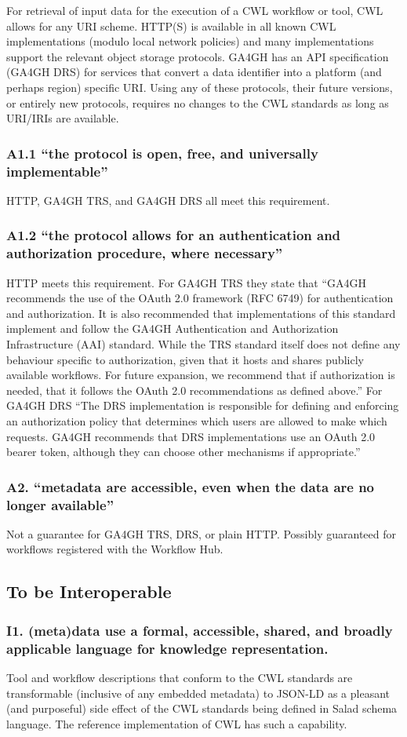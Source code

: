 For retrieval of input data for the execution of a CWL workflow or tool, CWL allows for any URI scheme. HTTP(S) is available in all known CWL implementations (modulo local network policies) and many implementations support the relevant object storage protocols. GA4GH has an API specification (GA4GH DRS) for services that convert a data identifier into a platform (and perhaps region) specific URI. Using any of these protocols, their future versions, or entirely new protocols, requires no changes to the CWL standards as long as URI/IRIs are available.
\subsubsection{A1.1 “the protocol is open, free, and universally implementable”}
HTTP, GA4GH TRS, and GA4GH DRS all meet this requirement.
\subsubsection{A1.2 “the protocol allows for an authentication and authorization procedure, where necessary”}
HTTP meets this requirement. For GA4GH TRS they state that “GA4GH recommends the use of the OAuth 2.0 framework (RFC 6749) for authentication and authorization. It is also recommended that implementations of this standard implement and follow the GA4GH Authentication and Authorization Infrastructure (AAI) standard.
While the TRS standard itself does not define any behaviour specific to authorization, given that it hosts and shares publicly available workflows. For future expansion, we recommend that if authorization is needed, that it follows the OAuth 2.0 recommendations as defined above.”
For GA4GH DRS “The DRS implementation is responsible for defining and enforcing an authorization policy that determines which users are allowed to make which requests. GA4GH recommends that DRS implementations use an OAuth 2.0 bearer token, although they can choose other mechanisms if appropriate.”
\subsubsection{A2. “metadata are accessible, even when the data are no longer available”}
Not a guarantee for GA4GH TRS, DRS, or plain HTTP. Possibly guaranteed for workflows registered with the Workflow Hub.
\subsection{To be Interoperable}
\subsubsection{I1. (meta)data use a formal, accessible, shared, and broadly applicable language for knowledge representation.}
Tool and workflow descriptions that conform to the CWL standards are transformable (inclusive of any embedded metadata) to JSON-LD as a pleasant (and purposeful) side effect of the CWL standards being defined in Salad schema language. The reference implementation of CWL has such a capability.

